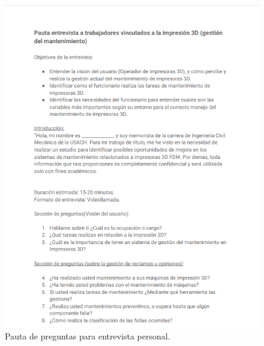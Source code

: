 \begin{figure}[H]
\centering
\includegraphics[scale=1]{images/pauta1.png}
\caption{Pauta de preguntas para entrevista personal.}

\end{figure}

